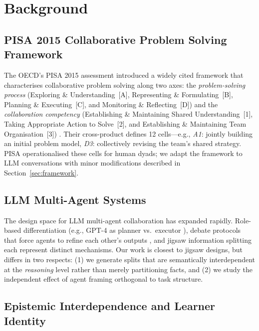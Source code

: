 \documentclass{article}
\begin{document}
\section{Background}
\label{sec:background}

\subsection{PISA 2015 Collaborative Problem Solving Framework}

The OECD's PISA 2015 assessment introduced a widely cited framework
that characterises collaborative problem solving along two axes: the
\emph{problem-solving process} (Exploring \& Understanding~[A],
Representing \& Formulating~[B], Planning \& Executing~[C], and
Monitoring \& Reflecting~[D]) and the \emph{collaboration competency}
(Establishing \& Maintaining Shared Understanding~[1], Taking
Appropriate Action to Solve~[2], and Establishing \& Maintaining Team
Organisation~[3]) \citep{pisa2015cps}. Their cross-product defines 12
cells---e.g., \textit{A1}: jointly building an initial problem model,
\textit{D3}: collectively revising the team's shared strategy. PISA
operationalised these cells for human dyads; we adapt the framework to
LLM conversations with minor modifications described in
Section~\ref{sec:framework}.

\subsection{LLM Multi-Agent Systems}

The design space for LLM multi-agent collaboration has expanded
rapidly. Role-based differentiation (e.g., GPT-4 as planner vs.\
executor \citep{park2023generative}), debate protocols that force
agents to refine each other's outputs \citep{liang2023encouraging},
and jigsaw information splitting \citep{du2023improving} each
represent distinct mechanisms. Our work is closest to jigsaw designs,
but differs in two respects: (1) we generate splits that are
semantically interdependent at the \emph{reasoning} level rather than
merely partitioning facts, and (2) we study the independent effect of
agent framing orthogonal to task structure.

\subsection{Epistemic Interdependence and Learner Identity}
\end{document}
